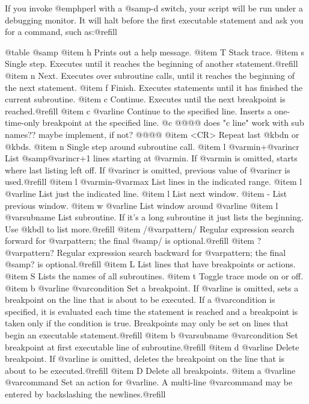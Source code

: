{{{{{{{{{{{{{If you invoke @emph{perl} with a @samp{-d} switch, your script will be run
under a debugging monitor.  It will halt before the first executable
statement and ask you for a command, such as:@refill

@table @samp
@item h
Prints out a help message.
@item T
Stack trace.
@item s
Single step.  Executes until it reaches the beginning of another
statement.@refill
@item n
Next.  Executes over subroutine calls, until it reaches the beginning of
the next statement.
@item f
Finish.  Executes statements until it has finished the current subroutine.
@item c
Continue.  Executes until the next breakpoint is reached.@refill
@item c @var{line}
Continue to the specified line.  Inserts a one-time-only breakpoint at
the specified line.
@c @@@@ does "c line" work with sub names?? maybe implement, if not? @@@@
@item <CR>
Repeat last @kbd{n} or @kbd{s}.
@item n
Single step around subroutine call.
@item l @var{min}+@var{incr}
List @samp{@var{incr}+1} lines starting at @var{min}.  If @var{min} is
omitted, starts where last listing left off.  If @var{incr} is omitted,
previous value of @var{incr} is used.@refill
@item l @var{min}-@var{max}
List lines in the indicated range.
@item l @var{line}
List just the indicated line.
@item l
List next window.
@item -
List previous window.
@item w @var{line}
List window around @var{line}
@item l @var{subname}
List subroutine.  If it's a long subroutine it just lists the beginning.
Use @kbd{l} to list more.@refill
@item /@var{pattern}/
Regular expression search forward for @var{pattern}; the final @samp{/}
is optional.@refill
@item ?@var{pattern}?
Regular expression search backward for @var{pattern}; the final
@samp{?} is optional.@refill
@item L
List lines that have breakpoints or actions.
@item S
Lists the names of all subroutines.
@item t
Toggle trace mode on or off.
@item b @var{line} @var{condition}
Set a breakpoint.  If @var{line} is omitted, sets a breakpoint on the
line that is about to be executed.  If a @var{condition} is specified,
it is evaluated each time the statement is reached and a breakpoint is
taken only if the condition is true.  Breakpoints may only be set on
lines that begin an executable statement.@refill
@item b @var{subname} @var{condition}
Set breakpoint at first executable line of subroutine.@refill
@item d @var{line}
Delete breakpoint.  If @var{line} is omitted, deletes the breakpoint on the
line that is about to be executed.@refill
@item D
Delete all breakpoints.
@item a @var{line} @var{command}
Set an action for @var{line}.  A multi-line @var{command} may be entered by
backslashing the newlines.@refill
}}}}}}}}}}}}}
